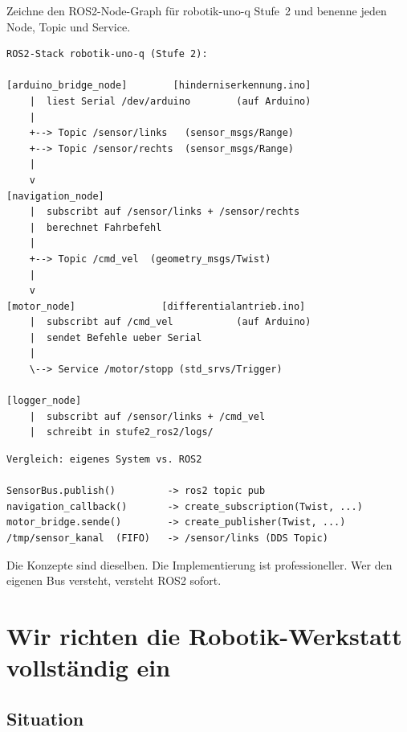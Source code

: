 \begin{aufgabeBox}
Zeichne den ROS2-Node-Graph für robotik-uno-q Stufe~2
und benenne jeden Node, Topic und Service.
\end{aufgabeBox}

\begin{lstlisting}[style=text]
ROS2-Stack robotik-uno-q (Stufe 2):

[arduino_bridge_node]        [hinderniserkennung.ino]
    |  liest Serial /dev/arduino        (auf Arduino)
    |
    +--> Topic /sensor/links   (sensor_msgs/Range)
    +--> Topic /sensor/rechts  (sensor_msgs/Range)
    |
    v
[navigation_node]
    |  subscribt auf /sensor/links + /sensor/rechts
    |  berechnet Fahrbefehl
    |
    +--> Topic /cmd_vel  (geometry_msgs/Twist)
    |
    v
[motor_node]               [differentialantrieb.ino]
    |  subscribt auf /cmd_vel           (auf Arduino)
    |  sendet Befehle ueber Serial
    |
    \--> Service /motor/stopp (std_srvs/Trigger)

[logger_node]
    |  subscribt auf /sensor/links + /cmd_vel
    |  schreibt in stufe2_ros2/logs/
\end{lstlisting}

\begin{lstlisting}[style=text]
Vergleich: eigenes System vs. ROS2

SensorBus.publish()         -> ros2 topic pub
navigation_callback()       -> create_subscription(Twist, ...)
motor_bridge.sende()        -> create_publisher(Twist, ...)
/tmp/sensor_kanal  (FIFO)   -> /sensor/links (DDS Topic)
\end{lstlisting}

\begin{merksatzBox}
Die Konzepte sind dieselben.
Die Implementierung ist professioneller.
Wer den eigenen Bus versteht, versteht ROS2 sofort.
\end{merksatzBox}

\chapter{Wir richten die Robotik-Werkstatt vollständig ein}

\kapitelstruktur

\section{Situation}

